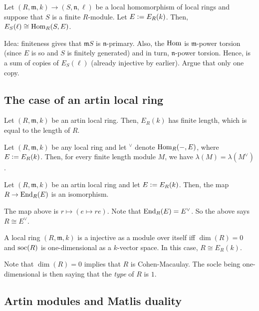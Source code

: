 \documentclass[12pt]{article}
\begin{document}
\begin{thm}
	Let $(R, \mathfrak{m}, k) \to (S, \mathfrak{n}, \ell)$ be a local homomorphism of local rings and suppose that $S$ is a finite $R$-module. Let $E \vcentcolon= E_{R}(k)$. Then, $E_{S}(\ell) \cong \operatorname{Hom}_{R}(S, E)$.
\end{thm}
Idea: finiteness gives that $\mathfrak{m}S$ is $\mathfrak{n}$-primary. Also, the $\operatorname{Hom}$ is $\mathfrak{m}$-power torsion (since $E$ is so and $S$ is finitely generated) and in turn, $\mathfrak{n}$-power torsion. Hence, is a sum of copies of $E_{S}(\ell)$ (already injective by earlier). Argue that only one copy.

\subsection{The case of an artin local ring}

\begin{thm}
	Let $(R, \mathfrak{m}, k)$ be an artin local ring. Then, $E_{R}(k)$ has finite length, which is equal to the length of $R$.
\end{thm}

\begin{lem} 
	Let $(R, \mathfrak{m}, k)$ be any local ring and let $^{\vee}$ denote $\operatorname{Hom}_{R}(-, E)$, where $E \vcentcolon= E_{R}(k)$. Then, for every finite length module $M$, we have $\lambda(M) = \lambda(M^{\vee})$.
\end{lem}

\begin{thm}
	Let $(R, \mathfrak{m}, k)$ be an artin local ring and let $E \vcentcolon= E_{R}(k)$. Then, the map $R \to \operatorname{End}_{R}(E)$ is an isomorphism.
\end{thm}
The map above is $r \mapsto (e \mapsto re)$. Note that $\operatorname{End}_{R}(E) = E^{\vee}$. So the above says $R \cong E^{\vee}$.

\begin{thm} \label{thm:local-ring-self-injective}
	A local ring $(R, \mathfrak{m}, k)$ is a injective as a module over itself iff $\dim(R) = 0$ and $\operatorname{soc}(R)$ is one-dimensional as a $k$-vector space. In this case, $R \cong E_{R}(k)$.
\end{thm}
Note that $\dim(R) = 0$ implies that $R$ is Cohen-Macaulay. The socle being one-dimensional is then saying that the \emph{type} of $R$ is $1$.

\subsection{Artin modules and Matlis duality}
\end{document}
